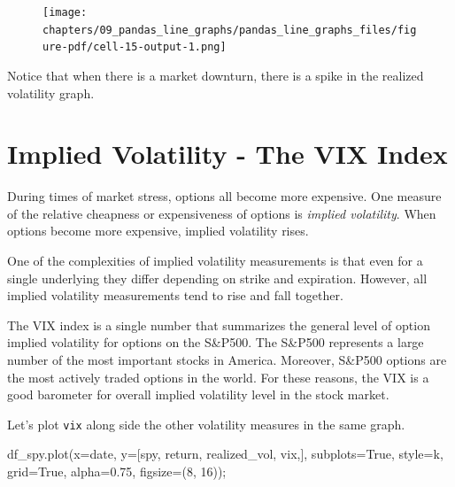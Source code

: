 \documentclass[
  letterpaper,
  DIV=11,
  numbers=noendperiod]{scrreprt}
\newenvironment{Shaded}{\begin{snugshade}}{\end{snugshade}}
\newcommand{\DecValTok}[1]{\textcolor[rgb]{0.68,0.00,0.00}{#1}}
\newcommand{\FloatTok}[1]{\textcolor[rgb]{0.68,0.00,0.00}{#1}}
\newcommand{\NormalTok}[1]{\textcolor[rgb]{0.00,0.23,0.31}{#1}}
\newcommand{\OperatorTok}[1]{\textcolor[rgb]{0.37,0.37,0.37}{#1}}
\newcommand{\StringTok}[1]{\textcolor[rgb]{0.13,0.47,0.30}{#1}}
\newcommand{\VariableTok}[1]{\textcolor[rgb]{0.07,0.07,0.07}{#1}}
\begin{document}
\begin{figure}[H]

{\centering \texttt{[image: chapters/09\_pandas\_line\_graphs/pandas\_line\_graphs\_files/figure-pdf/cell-15-output-1.png]}

}

\end{figure}

Notice that when there is a market downturn, there is a spike in the
realized volatility graph.

\hypertarget{implied-volatility---the-vix-index}{%
\section{Implied Volatility - The VIX
Index}\label{implied-volatility---the-vix-index}}

During times of market stress, options all become more expensive. One
measure of the relative cheapness or expensiveness of options is
\emph{implied volatility}. When options become more expensive, implied
volatility rises.

One of the complexities of implied volatility measurements is that even
for a single underlying they differ depending on strike and expiration.
However, all implied volatility measurements tend to rise and fall
together.

The VIX index is a single number that summarizes the general level of
option implied volatility for options on the S\&P500. The S\&P500
represents a large number of the most important stocks in America.
Moreover, S\&P500 options are the most actively traded options in the
world. For these reasons, the VIX is a good barometer for overall
implied volatility level in the stock market.

Let's plot \texttt{vix} along side the other volatility measures in the
same graph.

\begin{Shaded}
\begin{Highlighting}[]
\NormalTok{df\_spy.plot(x}\OperatorTok{=}\StringTok{\textquotesingle{}date\textquotesingle{}}\NormalTok{, y}\OperatorTok{=}\NormalTok{[}\StringTok{\textquotesingle{}spy\textquotesingle{}}\NormalTok{, }\StringTok{\textquotesingle{}return\textquotesingle{}}\NormalTok{, }\StringTok{\textquotesingle{}realized\_vol\textquotesingle{}}\NormalTok{, }\StringTok{\textquotesingle{}vix\textquotesingle{}}\NormalTok{,], subplots}\OperatorTok{=}\VariableTok{True}\NormalTok{, style}\OperatorTok{=}\StringTok{\textquotesingle{}k\textquotesingle{}}\NormalTok{, grid}\OperatorTok{=}\VariableTok{True}\NormalTok{, alpha}\OperatorTok{=}\FloatTok{0.75}\NormalTok{, figsize}\OperatorTok{=}\NormalTok{(}\DecValTok{8}\NormalTok{, }\DecValTok{16}\NormalTok{))}\OperatorTok{;}
\end{Highlighting}
\end{Shaded}
\end{document}
